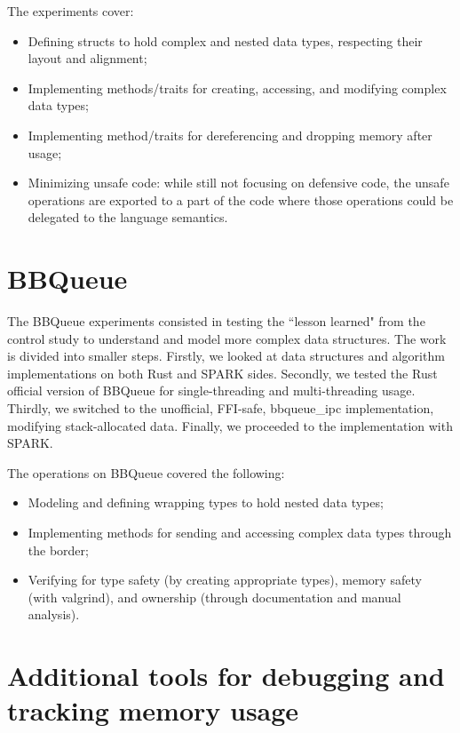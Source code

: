 \documentclass[nomenclature, english, bibtex]{kththesis}
\begin{document}
The experiments cover:

\begin{itemize}
    \item Defining structs to hold complex and nested data types, respecting their layout and alignment;
    \item Implementing methods/traits for creating, accessing, and modifying complex data types;
    \item Implementing method/traits for dereferencing and dropping memory after usage;
    \item Minimizing unsafe code: while still not focusing on defensive code, the unsafe operations are exported to a part of the code where those operations could be delegated to the language semantics.   
\end{itemize}




\section{BBQueue}

The BBQueue experiments consisted in testing the ``lesson learned" from the control study to understand and model more complex data structures. The work is divided into smaller steps. Firstly, we looked at data structures and algorithm implementations on both Rust and SPARK sides. Secondly, we tested the Rust official version of BBQueue for single-threading and multi-threading usage. Thirdly, we switched to the unofficial, FFI-safe, bbqueue\_ipc implementation, modifying stack-allocated data. 
Finally, we proceeded to the  implementation with SPARK.

The operations on BBQueue covered the following:
\begin{itemize}
    \item Modeling and defining wrapping types to hold nested data types;
    \item Implementing methods for sending and accessing complex data types through the  border;
    \item Verifying for type safety (by creating appropriate types), memory safety (with valgrind), and ownership (through documentation and manual analysis).
\end{itemize}

\section{Additional tools for debugging and tracking memory usage}
\end{document}
